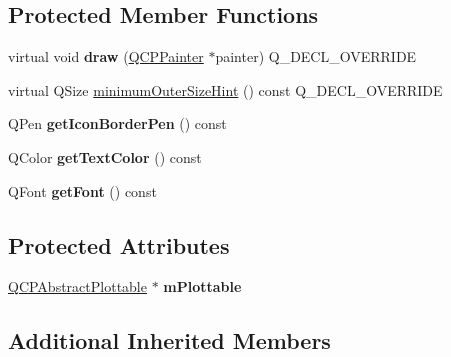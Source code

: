 \subsection*{Protected Member Functions}
\begin{DoxyCompactItemize}
\item 
virtual void {\bfseries draw} (\hyperlink{classQCPPainter}{Q\+C\+P\+Painter} $\ast$painter) Q\+\_\+\+D\+E\+C\+L\+\_\+\+O\+V\+E\+R\+R\+I\+DE\hypertarget{classQCPPlottableLegendItem_a5838366619200e99680afa6d355d13fa}{}\label{classQCPPlottableLegendItem_a5838366619200e99680afa6d355d13fa}

\item 
virtual Q\+Size \hyperlink{classQCPPlottableLegendItem_a8b543f3ac32b2fe59326e01c1101b3b8}{minimum\+Outer\+Size\+Hint} () const Q\+\_\+\+D\+E\+C\+L\+\_\+\+O\+V\+E\+R\+R\+I\+DE
\item 
Q\+Pen {\bfseries get\+Icon\+Border\+Pen} () const \hypertarget{classQCPPlottableLegendItem_ab36270e6b022a6961fa44136f35c0e4b}{}\label{classQCPPlottableLegendItem_ab36270e6b022a6961fa44136f35c0e4b}

\item 
Q\+Color {\bfseries get\+Text\+Color} () const \hypertarget{classQCPPlottableLegendItem_ad762b07439c738660ba93e78c1d03667}{}\label{classQCPPlottableLegendItem_ad762b07439c738660ba93e78c1d03667}

\item 
Q\+Font {\bfseries get\+Font} () const \hypertarget{classQCPPlottableLegendItem_a8a85c8a25affb4895423d730164d61de}{}\label{classQCPPlottableLegendItem_a8a85c8a25affb4895423d730164d61de}

\end{DoxyCompactItemize}
\subsection*{Protected Attributes}
\begin{DoxyCompactItemize}
\item 
\hyperlink{classQCPAbstractPlottable}{Q\+C\+P\+Abstract\+Plottable} $\ast$ {\bfseries m\+Plottable}\hypertarget{classQCPPlottableLegendItem_ada647fb4b22971a1a424e15b4f6af0d9}{}\label{classQCPPlottableLegendItem_ada647fb4b22971a1a424e15b4f6af0d9}

\end{DoxyCompactItemize}
\subsection*{Additional Inherited Members}


